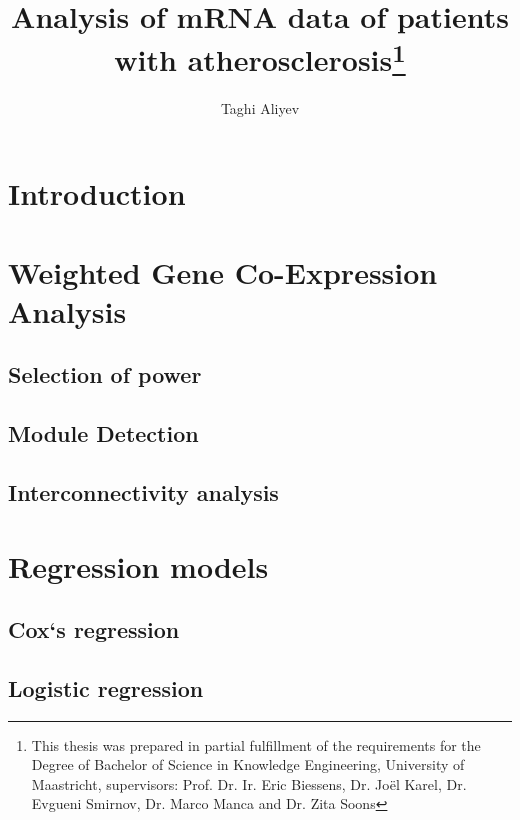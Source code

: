 \documentclass{ba-kecs}
\numberwithin{figure}{section}
\numberwithin{equation}{section}
\begin{document}
\title{Analysis of mRNA data of patients with atherosclerosis\footnote{This thesis was prepared in partial fulfillment of the requirements
 for the Degree of Bachelor of Science in Knowledge Engineering,
University of Maastricht,  supervisors: Prof. Dr. Ir. Eric Biessens, Dr. Jo\"{e}l Karel, Dr. Evgueni Smirnov, Dr. Marco Manca and Dr. Zita Soons}}
\author{Taghi Aliyev \\}
\maketitle



\begin{abstract}


\end{abstract}


\section{Introduction}

\section{Weighted Gene Co-Expression Analysis}
\subsection{Selection of power}
\subsection{Module Detection}
\subsection{Interconnectivity analysis}

\section{Regression models}
\subsection{Cox`s regression}
\subsection{Logistic regression}
\end{document}
